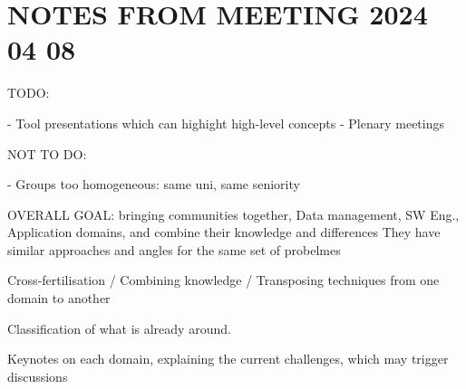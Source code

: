 \section{NOTES FROM MEETING 2024 04 08}
\label{sec:MM}

TODO:

- Tool presentations which can highight high-level concepts
- Plenary meetings 

NOT TO DO:

- Groups too homogeneous: same uni, same seniority


OVERALL GOAL: bringing communities together, Data management, SW Eng., Application domains, and combine their knowledge and differences 
They have similar approaches and angles for the same set of probelmes

Cross-fertilisation / Combining knowledge / Transposing techniques from one domain to another

Classification of what is already around.

Keynotes on each domain, explaining the current challenges, which may trigger discussions 


